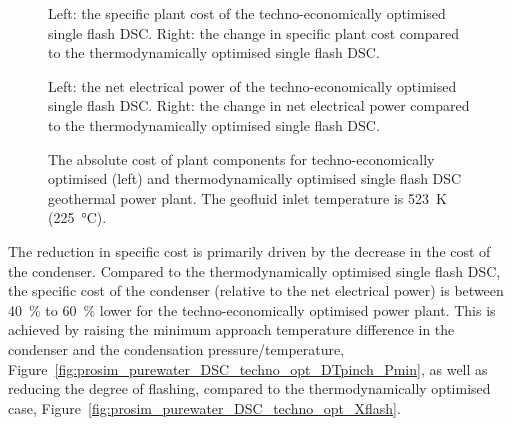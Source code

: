     \begin{figure}[H]
        \centering
        \resizebox{\linewidth}{!}{}
        \caption[The specific plant cost of the techno-economically optimised single flash \ac{DSC}.]{Left: the specific plant cost of the techno-economically optimised single flash \ac{DSC}. Right: the change in specific plant cost compared to the thermodynamically optimised single flash \ac{DSC}.}
        \label{fig:prosim_purewater_DeltaSpecCost_DSC_thermo_vs_techno}
    \end{figure}

    \begin{figure}[H]
        \centering
        \resizebox{\linewidth}{!}{}
        \caption[The net electrical power of the techno-economically optimised single flash \ac{DSC}.]{Left: the net electrical power of the techno-economically optimised single flash \ac{DSC}. Right: the change in net electrical power compared to the thermodynamically optimised single flash \ac{DSC}.}
        \label{fig:prosim_purewater_DeltaWnet_DSC_thermo_vs_techno}
    \end{figure}

    \begin{figure}[H]
        \centering
        
        \caption[The absolute cost of plant components for a techno-economically optimised and thermodynamically optimised single flash \ac{DSC} geothermal power plant.]{The absolute cost of plant components for techno-economically optimised (left) and thermodynamically optimised single flash \ac{DSC} geothermal power plant. The geofluid inlet temperature is \qty{523}{\K} (\qty{225}{\degreeCelsius}).}
        \label{fig:prosim_purewater_DSC_techno_opt_CostBreakdown}
    \end{figure}

    The reduction in specific cost is primarily driven by the decrease in the cost of the condenser. Compared to the thermodynamically optimised single flash \ac{DSC}, the specific cost of the condenser (relative to the net electrical power) is between \qty{40}{\percent} to \qty{60}{\percent} lower for the techno-economically optimised power plant. This is achieved by raising the minimum approach temperature difference in the condenser and the condensation pressure/temperature, Figure~\ref{fig:prosim_purewater_DSC_techno_opt_DTpinch_Pmin}, as well as reducing the degree of flashing, compared to the thermodynamically optimised case, Figure~\ref{fig:prosim_purewater_DSC_techno_opt_Xflash}.

